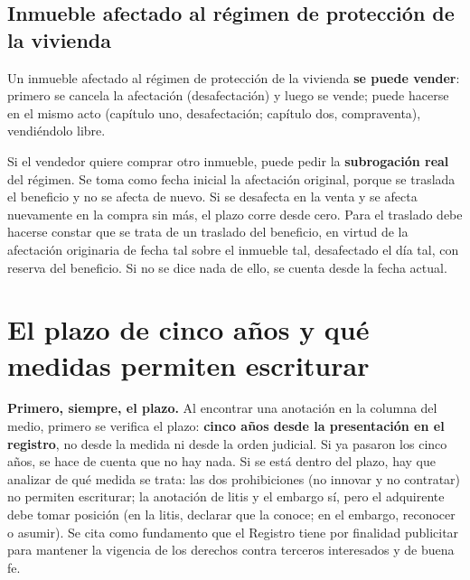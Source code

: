 \documentclass[12pt,oneside]{book}
\begin{document}
\subsection{Inmueble afectado al régimen de protección de la vivienda}

Un inmueble afectado al régimen de protección de la vivienda \textbf{se puede vender}: primero se cancela la afectación (desafectación) y luego se vende; puede hacerse en el mismo acto (capítulo uno, desafectación; capítulo dos, compraventa), vendiéndolo libre.

Si el vendedor quiere comprar otro inmueble, puede pedir la \textbf{subrogación real} del régimen. Se toma como fecha inicial la afectación original, porque se traslada el beneficio y no se afecta de nuevo. Si se desafecta en la venta y se afecta nuevamente en la compra sin más, el plazo corre desde cero. Para el traslado debe hacerse constar que se trata de un traslado del beneficio, en virtud de la afectación originaria de fecha tal sobre el inmueble tal, desafectado el día tal, con reserva del beneficio. Si no se dice nada de ello, se cuenta desde la fecha actual.

\section{El plazo de cinco años y qué medidas permiten escriturar}

\begin{important}
\textbf{Primero, siempre, el plazo.} Al encontrar una anotación en la columna del medio, primero se verifica el plazo: \textbf{cinco años desde la presentación en el registro}, no desde la medida ni desde la orden judicial. Si ya pasaron los cinco años, se hace de cuenta que no hay nada. Si se está dentro del plazo, hay que analizar de qué medida se trata: las dos prohibiciones (no innovar y no contratar) no permiten escriturar; la anotación de litis y el embargo sí, pero el adquirente debe tomar posición (en la litis, declarar que la conoce; en el embargo, reconocer o asumir). Se cita como fundamento que el Registro tiene por finalidad publicitar para mantener la vigencia de los derechos contra terceros interesados y de buena fe.
\end{important}
\end{document}
